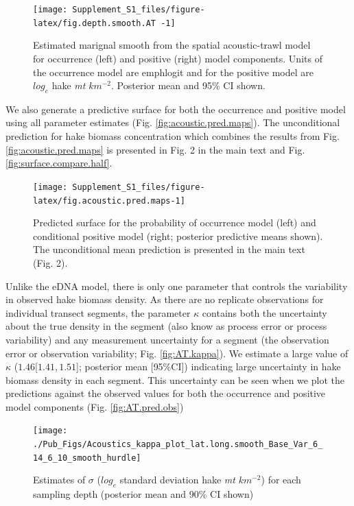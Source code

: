 \documentclass[
]{article}
\begin{document}
\begin{figure}
\texttt{[image: Supplement\_S1\_files/figure-latex/fig.depth.smooth.AT -1]} \caption{\label{fig:depth.smooth.AT} Estimated marignal smooth from the spatial acoustic-trawl model for occurrence (left) and positive (right) model components. Units of the occurrence model are emph{logit} and for the positive model are \(log_e\) hake \emph{mt} \(km^{-2}\). Posterior mean and 95\% CI shown.}\label{fig:fig.depth.smooth.AT }
\end{figure}

We also generate a predictive surface for both the occurrence and
positive model using all parameter estimates (Fig.
\ref{fig:acoustic.pred.maps}). The unconditional prediction for hake
biomass concentration which combines the results from Fig.
\ref{fig:acoustic.pred.maps} is presented in Fig. 2 in the main text and
Fig. \ref{fig:surface.compare.half}.

\begin{figure}
\texttt{[image: Supplement\_S1\_files/figure-latex/fig.acoustic.pred.maps-1]} \caption{\label{fig:acoustic.pred.maps} Predicted surface for the probability of occurrence model (left) and conditional positive model (right; posterior predictive means shown). The unconditional mean prediction is presented in the main text (Fig. 2). }\label{fig:fig.acoustic.pred.maps}
\end{figure}

Unlike the eDNA model, there is only one parameter that controls the
variability in observed hake biomass density. As there are no replicate
observations for individual transect segments, the parameter \(\kappa\)
contains both the uncertainty about the true density in the segment
(also know as process error or process variability) and any measurement
uncertainty for a segment (the observation error or observation
variability; Fig. \ref{fig:AT.kappa}). We estimate a large value of
\(\kappa\) (\(1.46\){[}\(1.41, 1.51\){]}; posterior mean {[}95\%CI{]})
indicating large uncertainty in hake biomass density in each segment.
This uncertainty can be seen when we plot the predictions against the
observed values for both the occurrence and positive model components
(Fig. \ref{fig:AT.pred.obs})

\begin{figure}
\texttt{[image: ./Pub\_Figs/Acoustics\_kappa\_plot\_lat.long.smooth\_Base\_Var\_6\_14\_6\_10\_smooth\_hurdle]} \caption{\label{fig:AT.kappa} Estimates of \(\sigma\) (\(log_e\) standard deviation hake \emph{mt} \(km^{-2}\)) for each sampling depth (posterior mean and 90\% CI shown)}\label{fig:fig.AT.kappa}
\end{figure}
\end{document}
